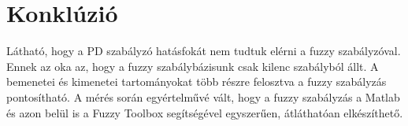 \section{Konklúzió}
Látható, hogy a PD szabályzó hatásfokát nem tudtuk elérni a fuzzy szabályzóval. Ennek az oka az, hogy a fuzzy szabálybázisunk csak kilenc szabályból állt. A bemenetei és kimenetei tartományokat több részre felosztva a fuzzy szabályzás pontosítható. A mérés során egyértelművé vált, hogy a fuzzy szabályzás a Matlab és azon belül is a Fuzzy Toolbox segítségével egyszerűen, átláthatóan elkészíthető.


